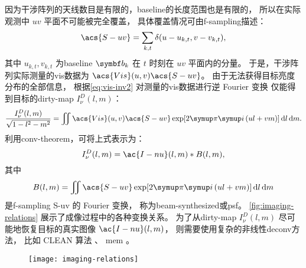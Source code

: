 因为干涉阵列的天线数目是有限的，\ac{baseline}的长度范围也是有限的，
所以在实际观测中 $uv$ 平面不可能被完全覆盖，
具体覆盖情况可由\acf{f-sampling}描述：
\begin{equation}
  \label{eq:sf}
  \acs{S-uv} = \sum_{k,t} \delta(u - u_{k,t}, v - v_{k,t}) ,
\end{equation}
其中 $u_{k,t}, v_{k,t}$ 为\ac{baseline} $\B{b}_k$
在 $t$ 时刻在 $uv$ 平面内的分量。
于是，干涉阵列实际测量的\ac{vis}数据为 $\acs{Vis}(u,v) \acs{S-uv}$。
由于无法获得目标亮度分布的全部信息，
根据\autoref{eq:vis-inv2} 对测量的\ac{vis}数据进行逆 Fourier 变换
仅能得到目标的\acf{dirty-map} $I_{\nu}^D(l,m)$：
\begin{equation}
  \label{eq:dirty-map}
  \frac{I_{\nu}^D(l,m)}{\sqrt{1-l^2-m^2}} = \iint
    \acs{Vis}(u,v) \acs{S-uv} \exp [2\Cpi\Ci\, (ul+vm)] \,\D{l}\,\D{m} .
\end{equation}
利用\ac{conv-theorem}，可将上式表示为：
\begin{equation}
  I_{\nu}^D(l,m) = \ac{I-nu}(l,m) * B(l,m) ,
\end{equation}
其中
\begin{equation}
  \label{eq:syn-beam}
  B(l,m) = \iint \acs{S-uv} \exp [2\Cpi\Ci\, (ul+vm)] \,\D{l}\,\D{m}
\end{equation}
是\ac{f-sampling} \acs{S-uv} 的 Fourier 变换，
称为\acf{beam-synthesized}或\acf{psf}。
\autoref{fig:imaging-relations} 展示了成像过程中的各种变换关系。
为了从\ac{dirty-map} $I_{\nu}^D(l,m)$ 尽可能地恢复目标的真实图像 $\ac{I-nu}(l,m)$，
则需要使用复杂的非线性\ac{deconv}方法，
比如 CLEAN 算法 \cite{hogbom1974,cornwell1999}、
\ac{mem} \cite{narayan1986}。

\begin{figure}[htp]
  \centering
  \texttt{[image: imaging-relations]}
  \label{fig:imaging-relations}
\end{figure}

